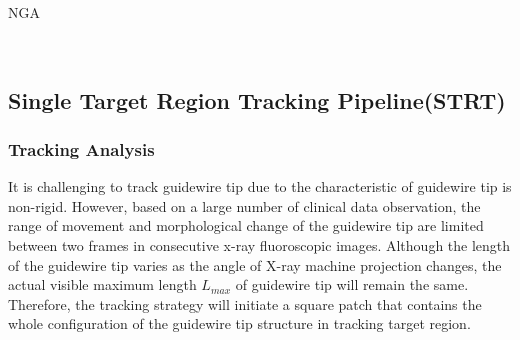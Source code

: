 \documentclass[journal]{IEEEtran}
\begin{document}
\begin{algorithm}[!ht]
\setlength{\abovedisplayskip}{3pt}
\setlength{\belowdisplayskip}{-3pt}
	\caption{NGA}
		\
		\
\end{algorithm}


\subsection{Single Target Region Tracking Pipeline(STRT)} 

\subsubsection{Tracking Analysis}
It is challenging to track guidewire tip due to the characteristic of guidewire tip is non-rigid. However, based on a large number of clinical data observation, the range of movement and morphological change of the guidewire tip are limited between two frames in consecutive x-ray fluoroscopic images. Although the length of the guidewire tip varies as the angle of X-ray machine projection changes, the actual visible maximum length $L_{max}$ of guidewire tip will remain the same. Therefore, the tracking strategy will initiate a square patch that contains the whole configuration of the guidewire tip structure in tracking target region. 
\end{document}
